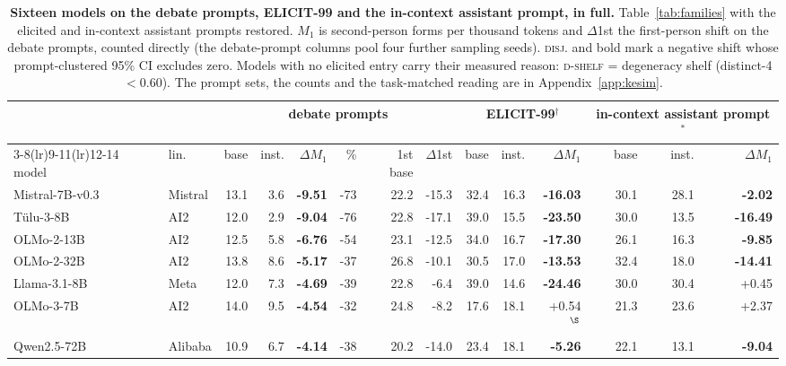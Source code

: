 \begin{table}[tb]
\centering\scriptsize\setlength{\tabcolsep}{2.6pt}
\caption{\textbf{Sixteen models on the debate prompts, ELICIT-99 and the in-context assistant prompt, in full.} Table~\ref{tab:families} with the elicited and in-context assistant prompts restored. $M_1$ is second-person forms per thousand tokens and $\Delta$1st the first-person shift on the debate prompts, counted directly (the debate-prompt columns pool four further sampling seeds). \textsc{disj.} and bold mark a negative shift whose prompt-clustered 95\% CI excludes zero. Models with no elicited entry carry their measured reason: \textsc{d-shelf} = degeneracy shelf (distinct-4 $< 0.60$). The prompt sets, the counts and the task-matched reading are in Appendix~\ref{app:kesim}.}
\label{tab:families-full}
\begin{tabular}{llrrrrrr@{\hspace{5pt}}rrr@{\hspace{5pt}}rrr}
\toprule
 & & \multicolumn{6}{c}{debate prompts} & \multicolumn{3}{c}{ELICIT-99$^{\dagger}$} & \multicolumn{3}{c}{in-context assistant prompt$^{\ast}$} \\
\cmidrule(lr){3-8}\cmidrule(lr){9-11}\cmidrule(lr){12-14}
model & lin. & base & inst. & $\Delta M_1$ & \% & 1st base & $\Delta$1st & base & inst. & $\Delta M_1$ & base & inst. & $\Delta M_1$ \\
\midrule
Mistral-7B-v0.3 & Mistral & 13.1 & 3.6 & \textbf{-9.51} & -73 & 22.2 & -15.3 & 32.4 & 16.3 & \textbf{-16.03} & 30.1 & 28.1 & \textbf{-2.02} \\
T\"ulu-3-8B & AI2 & 12.0 & 2.9 & \textbf{-9.04} & -76 & 22.8 & -17.1 & 39.0 & 15.5 & \textbf{-23.50} & 30.0 & 13.5 & \textbf{-16.49} \\
OLMo-2-13B & AI2 & 12.5 & 5.8 & \textbf{-6.76} & -54 & 23.1 & -12.5 & 34.0 & 16.7 & \textbf{-17.30} & 26.1 & 16.3 & \textbf{-9.85} \\
OLMo-2-32B & AI2 & 13.8 & 8.6 & \textbf{-5.17} & -37 & 26.8 & -10.1 & 30.5 & 17.0 & \textbf{-13.53} & 32.4 & 18.0 & \textbf{-14.41} \\
Llama-3.1-8B & Meta & 12.0 & 7.3 & \textbf{-4.69} & -39 & 22.8 & -6.4 & 39.0 & 14.6 & \textbf{-24.46} & 30.0 & 30.4 & +0.45 \\
OLMo-3-7B & AI2 & 14.0 & 9.5 & \textbf{-4.54} & -32 & 24.8 & -8.2 & 17.6 & 18.1 & +0.54$^{\S}$ & 21.3 & 23.6 & +2.37 \\
Qwen2.5-72B & Alibaba & 10.9 & 6.7 & \textbf{-4.14} & -38 & 20.2 & -14.0 & 23.4 & 18.1 & \textbf{-5.26} & 22.1 & 13.1 & \textbf{-9.04} \\

\end{tabular}
\end{table}
